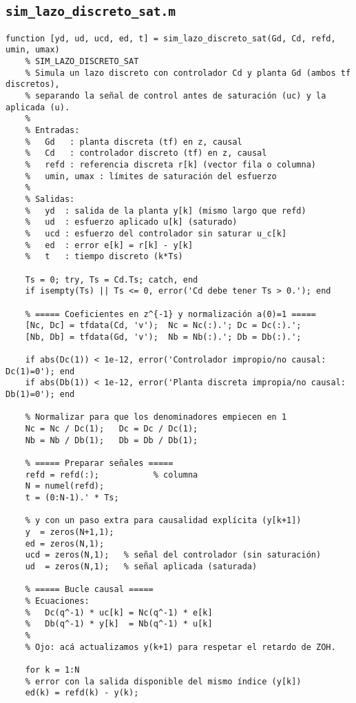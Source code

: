 \subsection{\texttt{sim\_lazo\_discreto\_sat.m}}
\begin{lstlisting}[style=matlabstyle,caption={Simulación de lazo discreto con saturación.}]
	function [yd, ud, ucd, ed, t] = sim_lazo_discreto_sat(Gd, Cd, refd, umin, umax)
	% SIM_LAZO_DISCRETO_SAT
	% Simula un lazo discreto con controlador Cd y planta Gd (ambos tf discretos),
	% separando la señal de control antes de saturación (uc) y la aplicada (u).
	%
	% Entradas:
	%   Gd   : planta discreta (tf) en z, causal
	%   Cd   : controlador discreto (tf) en z, causal
	%   refd : referencia discreta r[k] (vector fila o columna)
	%   umin, umax : límites de saturación del esfuerzo
	%
	% Salidas:
	%   yd  : salida de la planta y[k] (mismo largo que refd)
	%   ud  : esfuerzo aplicado u[k] (saturado)
	%   ucd : esfuerzo del controlador sin saturar u_c[k]
	%   ed  : error e[k] = r[k] - y[k]
	%   t   : tiempo discreto (k*Ts)
	
	Ts = 0; try, Ts = Cd.Ts; catch, end
	if isempty(Ts) || Ts <= 0, error('Cd debe tener Ts > 0.'); end
	
	% ===== Coeficientes en z^{-1} y normalización a(0)=1 =====
	[Nc, Dc] = tfdata(Cd, 'v');  Nc = Nc(:).'; Dc = Dc(:).';
	[Nb, Db] = tfdata(Gd, 'v');  Nb = Nb(:).'; Db = Db(:).';
	
	if abs(Dc(1)) < 1e-12, error('Controlador impropio/no causal: Dc(1)=0'); end
	if abs(Db(1)) < 1e-12, error('Planta discreta impropia/no causal: Db(1)=0'); end
	
	% Normalizar para que los denominadores empiecen en 1
	Nc = Nc / Dc(1);   Dc = Dc / Dc(1);
	Nb = Nb / Db(1);   Db = Db / Db(1);
	
	% ===== Preparar señales =====
	refd = refd(:);           % columna
	N = numel(refd);
	t = (0:N-1).' * Ts;
	
	% y con un paso extra para causalidad explícita (y[k+1])
	y  = zeros(N+1,1);
	ed = zeros(N,1);
	ucd = zeros(N,1);   % señal del controlador (sin saturación)
	ud  = zeros(N,1);   % señal aplicada (saturada)
	
	% ===== Bucle causal =====
	% Ecuaciones:
	%   Dc(q^-1) * uc[k] = Nc(q^-1) * e[k]
	%   Db(q^-1) * y[k]  = Nb(q^-1) * u[k]
	%
	% Ojo: acá actualizamos y(k+1) para respetar el retardo de ZOH.
	
	for k = 1:N
	% error con la salida disponible del mismo índice (y[k])
	ed(k) = refd(k) - y(k);
	

\end{lstlisting}
